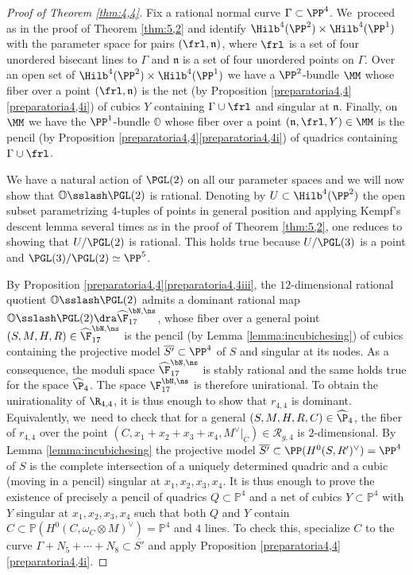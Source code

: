 \begin{proof}[Proof of Theorem \ref{thm:4,4}]
Fix a rational normal curve $\Gamma\subset\PP^4$. We~proceed as in the proof of Theorem \ref{thm:5,2} and identify $\Hilb^4({\PP^2})\times \Hilb^4(\PP^1)$ with the parameter space for pairs $(\frl,\mathfrak n)$, where $\frl$ is a set of four unordered bisecant lines to $\Gamma$ and $\mathfrak{n}$ is a set of four unordered points on $\Gamma$. Over an open set of $\Hilb^4({\PP^2})\times \Hilb^4(\PP^1)$ we have a $\PP^2$-bundle $\MM$ whose fiber over a point $\left(\frl,\mathfrak{n} \right)$ is the net (by Proposition \ref{preparatoria4,4}\eqref{preparatoria4,4i}) of cubics $Y$ containing
$\Gamma \cup \frl$ and singular at $\mathfrak{n}$. Finally, on
$\MM$ we have the $\PP^1$-bundle $\mathbb O$ whose fiber over a point $\left(\mathfrak{n},\frl,Y\right)\in\MM$ is the pencil (by Proposition \ref{preparatoria4,4}\eqref{preparatoria4,4i}) of quadrics containing
$\Gamma \cup \frl$.

We have a natural action of $\PGL(2)$ on all our parameter spaces and we will now show that $\mathbb O\sslash\PGL(2)$ is rational. Denoting by $U\subset \Hilb^4({\PP^2})$ the open subset parametrizing $4$-tuples of points in general position and applying Kempf's descent lemma several times as in the proof of Theorem \ref{thm:5,2}, one reduces to showing that $U/\PGL(2)$ is rational. This holds true because $U/\PGL(3)$ is a point and
$
\PGL(3)/\PGL(2)\simeq \PP^5$.\enlargethispage{\baselineskip}%

By Proposition \ref{preparatoria4,4}\eqref{preparatoria4,4iii}, the $12$-dimensional rational quotient $\mathbb O\sslash\PGL(2)$ admits a dominant rational map
$\mathbb O\sslash\PGL(2)\dra \widehat{\F}_{17}^{\bN,\ns}$, whose fiber over a general point \linebreak $(S,M,H,R)\in \widehat{\F}_{17}^{\bN,\ns}$ is the pencil (by Lemma \ref{lemma:incubichesing}) of cubics containing the projective model $\overline{S'}\subset \PP^4$ of $S$ and singular at its nodes. As a consequence, the moduli space $\widehat{\F}_{17}^{\bN,\ns}$ is stably rational and the same holds true for the space $\widehat\P_{4}$. The space
${\F}_{17}^{\bN,\ns}$ is therefore unirational.
To obtain the unirationality of $\R_{4,4}$, it is thus enough to show that $r_{4,4}$ is dominant. Equivalently, we~need to check that for a general $(S,M,H,R,C)\in \widehat\P_{4}$, the fiber of $r_{4,4}$ over the point $(C,x_1+x_2+x_3+x_4,M^\vee|_C)\in \mathcal R_{g,4}$ is $2$-dimensional. By Lemma \ref{lemma:incubichesing} the projective model $\overline{S'}\subset \PP(H^0(S,R')^\vee)=\PP^4$ of $S$ is the complete intersection of a uniquely determined quadric and a cubic (moving in a pencil) singular at $x_1,x_2,x_3,x_4$. It is thus enough to prove the existence of precisely a pencil of quadrics $Q \subset\mathbb P^4$ and a net of cubics $Y\subset\mathbb P^4$ with $Y$ singular at $x_1,x_2,x_3,x_4$ such that both $Q$ and $Y$ contain $C\subset \mathbb P(H^0(C,\omega_C\otimes M)^\vee)=\mathbb P^4$ and $4$ lines. To check this, specialize $C$ to the curve $\Gamma+N_5+\cdots+N_8\subset \overline{S'}$ and apply Proposition \ref{preparatoria4,4}\eqref{preparatoria4,4i}. 
\end{proof}


